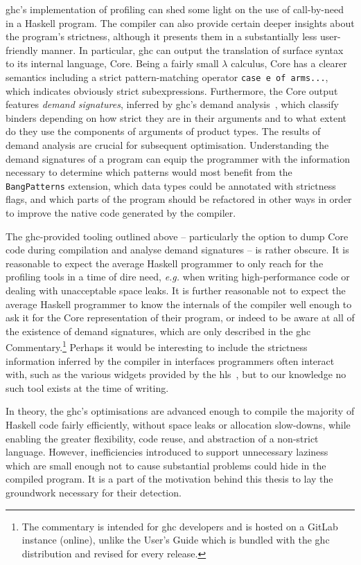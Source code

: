 \documentclass[thesis=B,english]{FITthesis}[2019/12/23]
\newcommand{\eg}{\emph{e.g.}\xspace}
\newcommand{\hsCode}[1]{\texttt{#1}}
\begin{document}
\acrshort{ghc}'s implementation of profiling can shed some light on the use of
call-by-need in a Haskell program. The compiler can also provide certain deeper
insights about the program's strictness, although it presents them in a
substantially less user-friendly manner. In particular, \acrshort{ghc} can
output the translation of surface syntax to its internal language, Core. Being
a fairly small $\lambda$ calculus, Core has a clearer semantics including a
strict pattern-matching operator \hsCode{case e of arms...}, which indicates
obviously strict subexpressions. Furthermore, the Core output features
\textit{demand signatures}, inferred by \acrshort{ghc}'s demand
analysis~\cite{cmtary-demand-analysis}, which classify binders depending on how
strict they are in their arguments and to what extent do they use the
components of arguments of product types. The results of demand analysis are
crucial for subsequent optimisation. Understanding the demand signatures of a
program can equip the programmer with the information necessary to determine
which patterns would most benefit from the \texttt{BangPatterns} extension,
which data types could be annotated with strictness flags, and which parts of
the program should be refactored in other ways in order to improve the native
code generated by the compiler.

The \acrshort{ghc}-provided tooling outlined above -- particularly the option
to dump Core code during compilation and analyse demand signatures -- is rather
obscure. It is reasonable to expect the average Haskell programmer to only
reach for the profiling tools in a time of dire need, \eg when writing
high-performance code or dealing with unacceptable space leaks. It is further
reasonable not to expect the average Haskell programmer to know the internals
of the compiler well enough to ask it for the Core representation of their
program, or indeed to be aware at all of the existence of demand signatures,
which are only described in the \acrshort{ghc} Commentary.\footnote{
	The commentary is intended for \acrshort{ghc} developers and is hosted on a
	GitLab instance (online), unlike the User's Guide which is bundled with the
	\acrshort{ghc} distribution and revised for every release.
} Perhaps it would be interesting to include the strictness information
inferred by the compiler in interfaces programmers often interact with, such as
the various widgets provided by the \acrfull{hls}~\cite{gh-hls}, but to our
knowledge no such tool exists at the time of writing.

In theory, the \acrlong{ghc}'s optimisations are advanced enough to compile the
majority of Haskell code fairly efficiently, without space leaks or allocation
slow-downs, while enabling the greater flexibility, code reuse, and abstraction
of a non-strict language. However, inefficiencies introduced to support
unnecessary laziness which are small enough not to cause substantial problems
could hide in the compiled program. It is a part of the motivation behind this
thesis to lay the groundwork necessary for their detection.
\end{document}
